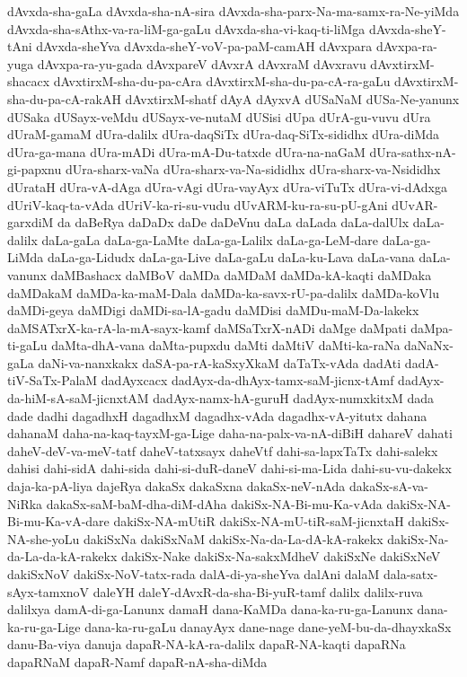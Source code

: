 {dAvxda-sha-gaLa
dAvxda-sha-nA-sira
dAvxda-sha-parx-Na-ma-samx-ra-Ne-yiMda
dAvxda-sha-sAthx-va-ra-liM-ga-gaLu
dAvxda-sha-vi-kaq-ti-liMga
dAvxda-sheY-tAni
dAvxda-sheYva
dAvxda-sheY-voV-pa-paM-camAH
dAvxpara
dAvxpa-ra-yuga
dAvxpa-ra-yu-gada
dAvxpareV
dAvxrA
dAvxraM
dAvxravu
dAvxtirxM-shacacx
dAvxtirxM-sha-du-pa-cAra
dAvxtirxM-sha-du-pa-cA-ra-gaLu
dAvxtirxM-sha-du-pa-cA-rakAH
dAvxtirxM-shatf
dAyA
dAyxvA
dUSaNaM
dUSa-Ne-yanunx
dUSaka
dUSayx-veMdu
dUSayx-ve-nutaM
dUSisi
dUpa
dUrA-gu-vuvu
dUra
dUraM-gamaM
dUra-dalilx
dUra-daqSiTx
dUra-daq-SiTx-sididhx
dUra-diMda
dUra-ga-mana
dUra-mADi
dUra-mA-Du-tatxde
dUra-na-naGaM
dUra-sathx-nA-gi-papxnu
dUra-sharx-vaNa
dUra-sharx-va-Na-sididhx
dUra-sharx-va-Nsididhx
dUrataH
dUra-vA-dAga
dUra-vAgi
dUra-vayAyx
dUra-viTuTx
dUra-vi-dAdxga
dUriV-kaq-ta-vAda
dUriV-ka-ri-su-vudu
dUvARM-ku-ra-su-pU-gAni
dUvAR-garxdiM
da
daBeRya
daDaDx
daDe
daDeVnu
daLa
daLada
daLa-dalUlx
daLa-dalilx
daLa-gaLa
daLa-ga-LaMte
daLa-ga-Lalilx
daLa-ga-LeM-dare
daLa-ga-LiMda
daLa-ga-Lidudx
daLa-ga-Live
daLa-gaLu
daLa-ku-Lava
daLa-vana
daLa-vanunx
daMBashacx
daMBoV
daMDa
daMDaM
daMDa-kA-kaqti
daMDaka
daMDakaM
daMDa-ka-maM-Dala
daMDa-ka-savx-rU-pa-dalilx
daMDa-koVlu
daMDi-geya
daMDigi
daMDi-sa-lA-gadu
daMDisi
daMDu-maM-Da-lakekx
daMSATxrX-ka-rA-la-mA-sayx-kamf
daMSaTxrX-nADi
daMge
daMpati
daMpa-ti-gaLu
daMta-dhA-vana
daMta-pupxdu
daMti
daMtiV
daMti-ka-raNa
daNaNx-gaLa
daNi-va-nanxkakx
daSA-pa-rA-kaSxyXkaM
daTaTx-vAda
dadAti
dadA-tiV-SaTx-PalaM
dadAyxcacx
dadAyx-da-dhAyx-tamx-saM-jicnx-tAmf
dadAyx-da-hiM-sA-saM-jicnxtAM
dadAyx-namx-hA-guruH
dadAyx-numxkitxM
dada
dade
dadhi
dagadhxH
dagadhxM
dagadhx-vAda
dagadhx-vA-yitutx
dahana
dahanaM
daha-na-kaq-tayxM-ga-Lige
daha-na-palx-va-nA-diBiH
dahareV
dahati
daheV-deV-va-meV-tatf
daheV-tatxsayx
daheVtf
dahi-sa-lapxTaTx
dahi-salekx
dahisi
dahi-sidA
dahi-sida
dahi-si-duR-daneV
dahi-si-ma-Lida
dahi-su-vu-dakekx
daja-ka-pA-liya
dajeRya
dakaSx
dakaSxna
dakaSx-neV-nAda
dakaSx-sA-va-NiRka
dakaSx-saM-baM-dha-diM-dAha
dakiSx-NA-Bi-mu-Ka-vAda
dakiSx-NA-Bi-mu-Ka-vA-dare
dakiSx-NA-mUtiR
dakiSx-NA-mU-tiR-saM-jicnxtaH
dakiSx-NA-she-yoLu
dakiSxNa
dakiSxNaM
dakiSx-Na-da-La-dA-kA-rakekx
dakiSx-Na-da-La-da-kA-rakekx
dakiSx-Nake
dakiSx-Na-sakxMdheV
dakiSxNe
dakiSxNeV
dakiSxNoV
dakiSx-NoV-tatx-rada
dalA-di-ya-sheYva
dalAni
dalaM
dala-satx-sAyx-tamxnoV
daleYH
daleY-dAvxR-da-sha-Bi-yuR-tamf
dalilx
dalilx-ruva
dalilxya
damA-di-ga-Lanunx
damaH
dana-KaMDa
dana-ka-ru-ga-Lanunx
dana-ka-ru-ga-Lige
dana-ka-ru-gaLu
danayAyx
dane-nage
dane-yeM-bu-da-dhayxkaSx
danu-Ba-viya
danuja
dapaR-NA-kA-ra-dalilx
dapaR-NA-kaqti
dapaRNa
dapaRNaM
dapaR-Namf
dapaR-nA-sha-diMda
}
